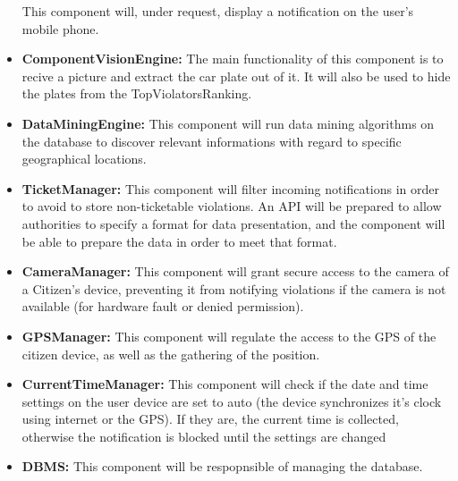 \documentclass{article}
\begin{document}
\begin{itemize}
		 	This component will, under request, display a notification on the user's mobile phone.
		 \item \label{component:ComputerVisionEngine} \textbf{ComponentVisionEngine:}
		 	The main functionality of this component is to recive a picture and extract the car plate out of it.
		 	It will also be used to hide the plates from the TopViolatorsRanking.
		 \item \label{component:DataMiningEngine} \textbf{DataMiningEngine:}
		 	This component will run data mining algorithms on the database to discover relevant informations with regard to specific geographical
		 	locations.
		 \item \label{component:TicketManager} \textbf{TicketManager:}
		 	This component will filter incoming notifications in order to avoid to store non-ticketable violations. An API will be prepared to allow 
		 	authorities to specify a format for data presentation, and the component will be able to prepare the data in order to meet that format.
		 \item \label{component:CameraManager} \textbf{CameraManager:}
		 	This component will grant secure access to the camera of a Citizen's device, preventing it from notifying violations if the camera is not 
		 	available (for hardware fault or denied permission).
		 \item \label{component:GPSManager} \textbf{GPSManager:}
		 	This component will regulate the access to the GPS of the citizen device, as well as the gathering of the position.
		 \item \label{component:CurrentTimeManager} \textbf{CurrentTimeManager:}
		 	This component will check if the date and time settings on the user device are set to auto (the device synchronizes it's clock using 
		 	internet or the GPS). If they are, the current time is collected, otherwise the notification is blocked until the settings are changed
		 \item \label{component:DBMS} \textbf{DBMS:}
		 	This component will be respopnsible of managing the database.
	\end{itemize}
\end{document}
